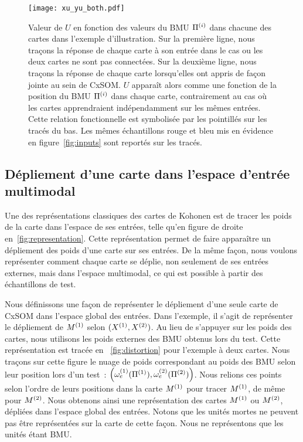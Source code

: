 \documentclass[../main]{subfiles}
\begin{document}
\begin{figure}
\centering
\texttt{[image: xu\_yu\_both.pdf]}
\caption{Valeur de $U$ en fonction des valeurs du BMU $\Pi^{({i})}$ dans chacune des cartes dans l'exemple d'illustration. Sur la première ligne, nous traçons la réponse de chaque carte à son entrée dans le cas ou les deux cartes ne sont pas connectées. Sur la deuxième ligne, nous traçons la réponse de chaque carte lorsqu'elles ont appris de façon jointe au sein de CxSOM.
$U$ apparaît alors comme une fonction de la position du BMU $\Pi^{({i})}$ dans chaque carte, contrairement au cas où les cartes apprendraient indépendamment sur les mêmes entrées. Cette relation fonctionnelle est symbolisée par les pointillés sur les tracés du bas. Les mêmes échantillons rouge et bleu mis en évidence en figure~\ref{fig:inputs} sont reportés sur les tracés.
\label{fig:piu}}
\end{figure}

\subsection{Dépliement d'une carte dans l'espace d'entrée multimodal}

Une des représentations classiques des cartes de Kohonen est de tracer les poids de la carte dans l'espace de ses entrées, telle qu'en figure de droite en~\ref{fig:representation}. Cette représentation permet de faire apparaître un dépliement des poids d'une carte sur ses entrées.
De la même façon, nous voulons représenter comment chaque carte se déplie, non seulement de ses entrées externes, mais dans l'espace multimodal, ce qui est possible à partir des échantillons de test.

Nous définissons une façon de représenter le dépliement d'une seule carte de CxSOM dans l'espace global des entrées. Dans l'exemple, il s'agit de représenter le dépliement de $M^{({1})}$ selon $(X^{({1})},X^{({2})})$.
Au lieu de s'appuyer sur les poids des cartes, nous utilisons les poids externes des BMU obtenus lors du test. Cette représentation est tracée en ~\ref{fig:distortion} pour l'exemple à deux cartes.
Nous traçons sur cette figure le nuage de poids correspondant au poids des BMU selon leur position lors d'un test~: $\left( \omega_e^{({1})}(\Pi^{({1})}),\omega_e^{({2})}(\Pi^{({2})}) \right)$. 
Nous relions ces points selon l'ordre de leurs positions dans la carte $M^{({1})}$ pour tracer $M^{({1})}$, de même pour $M^{({2})}$. 
Nous obtenons ainsi une représentation des cartes $M^{({1})}$ ou $M^{({2})}$, dépliées dans l'espace global des entrées. 
Notons que les unités mortes ne peuvent pas être représentées sur la carte de cette façon. Nous ne représentons que les unités étant BMU. 
\end{document}
